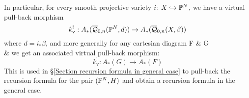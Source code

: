 In particular, for every smooth projective variety $i\colon X\hookrightarrow\mathbb P^N$, we have a virtual pull-back morphism
\begin{equation*} k^!_{\text{v}} : A_*(\overline{\mathcal Q}_{0,n}(\mathbb P^N,d)) \rightarrow A_*(\overline{\mathcal Q}_{0,n}(X,\beta)) \end{equation*}
where $d=i_*\beta$, and more generally for any cartesian diagram
\bcd
F \ar[r] \ar[d]  & G \ar[d] \\
 \ar[r,"k"] & 
\ecd
we get an associated virtual pull-back morphism:
\begin{equation*} k^!_{\text{v}} : A_*(G) \to A_*(F) \end{equation*}
This is used in \S \ref{Section recursion formula in general case} to pull-back the recursion formula for the pair $(\mathbb P^N,H)$ and obtain a recursion formula in the general case.